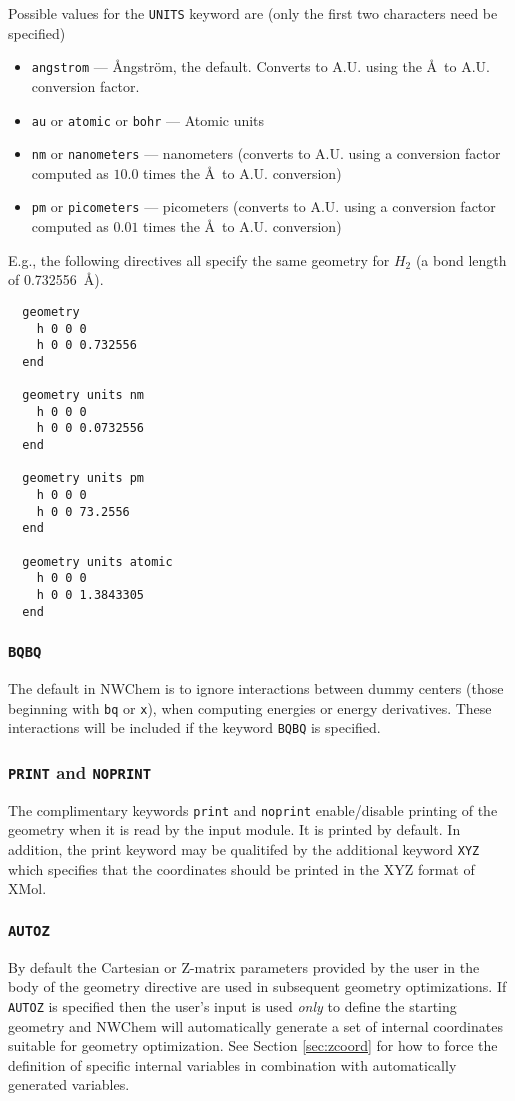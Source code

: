 Possible values for the \verb+UNITS+ keyword are (only the first two
characters need be specified)
\begin{itemize}
  \item \verb+angstrom+ --- {\AA}ngstr\"{o}m, the default.  Converts
   to A.U. using the \AA\ to A.U. conversion factor.
  \item \verb+au+ or \verb+atomic+ or \verb+bohr+ --- Atomic units
  \item \verb+nm+ or \verb+nanometers+ --- nanometers (converts to
     A.U. using a conversion factor computed as $10.0$ times the
     \AA\ to A.U. conversion) 
  \item \verb+pm+ or \verb+picometers+ --- picometers (converts to 
    A.U. using a conversion factor computed as $0.01$ times the 
     \AA\ to A.U. conversion)
\end{itemize}

E.g., the following directives all specify the same geometry for $H_2$
(a bond length of 0.732556\ \AA).
\begin{verbatim}
  geometry
    h 0 0 0
    h 0 0 0.732556
  end

  geometry units nm
    h 0 0 0
    h 0 0 0.0732556
  end

  geometry units pm
    h 0 0 0
    h 0 0 73.2556
  end

  geometry units atomic
    h 0 0 0
    h 0 0 1.3843305
  end
\end{verbatim}
      
\subsubsection*{{\tt BQBQ}}
The default in NWChem is to ignore interactions between dummy centers
(those beginning with \verb+bq+ or \verb+x+),
when computing energies or energy derivatives.  These interactions
will be included if the keyword \verb+BQBQ+ is specified.

\subsubsection*{{\tt PRINT} and {\tt NOPRINT}}
The complimentary keywords \verb+print+ and \verb+noprint+
enable/disable printing of the geometry when it is read by the input
module.  It is printed by default.  In addition, the print keyword may
be qualitifed by the additional keyword \verb+XYZ+ which specifies
that the coordinates should be printed in the XYZ format of XMol.

\subsubsection*{{\tt AUTOZ}}
By default the Cartesian or Z-matrix parameters provided by the user
in the body of the geometry directive are used in subsequent geometry
optimizations.  If \verb+AUTOZ+ is specified then the user's input is
used {\em only} to define the starting geometry and NWChem will
automatically generate a set of internal coordinates suitable for
geometry optimization.  See Section \ref{sec:zcoord} for how to
force the definition of specific internal variables in combination
with automatically generated variables.

